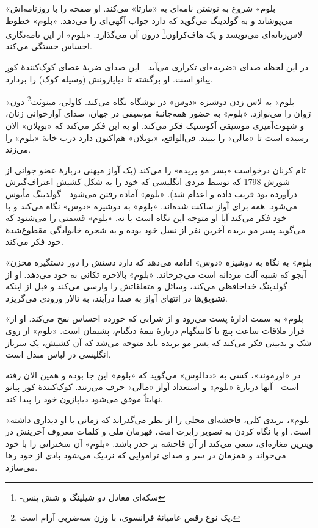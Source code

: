 \documentclass[12pt]{book}
\newcommand{\noun}[1]{«{#1}»}
\begin{document}
    \noun{بلوم} شروع به نوشتن نامه‌ای به \noun{مارتا} می‌کند. او صفحه را با روزنامه‌اش می‌پوشاند و به گولدینگ می‌گوید که دارد جواب آگهی‌ای را می‌دهد. \noun{بلوم} خطوط لاس‌زنانه‌ای می‌نویسد و یک هاف‌کراون\footnote{-سکه‌ای معادل دو شیلینگ و شش پنس} درون آن می‌گذارد. \noun{بلوم} از این نامه‌نگاری احساس خستگی می‌کند.

    در این لحظه صدای «ضربه»‌ای تکراری می‌آید - این صدای ضربۀ عصای کوک‌کنندۀ کورِ پیانو است. او برگشته تا دیاپازونش (وسیله کوک) را بردارد.

    \noun{بلوم} به لاس زدن دوشیزه \noun{دوس} در نوشگاه نگاه می‌کند. کاولی، مینوئت\footnote{یک نوع رقص عامیانۀ فرانسوی، با وزن سه‌ضربی آرام است.} دون ژوان را می‌نوازد. \noun{بلوم} به حضور همه‌جانبۀ موسیقی در جهان، صدای آوازخوانی زنان، و شهوت‌آمیزی موسیقی آکوستیک فکر می‌کند. او به این فکر می‌کند که \noun{بویلان} الان رسیده است تا \noun{مالی} را ببیند. فی‌الواقع، \noun{بویلان} هم‌اکنون دارد درب خانۀ \noun{بلوم} را می‌زند.

    تام کرنان درخواست «پسر مو بریده» را می‌کند (یک آواز میهنی دربارۀ عضو جوانی از شورش 1798 که توسط مردی انگلیسی که خود را به شکل کشیش اعتراف‌گیرش درآورده بود فریب داده و اعدام شد). \noun{بلوم} آماده رفتن می‌شود - گولدینگ مأیوس می‌شود. همه برای آواز ساکت شده‌اند. \noun{بلوم} به دوشیزه \noun{دوس} نگاه می‌کند و با خود فکر می‌کند آیا او متوجه این نگاه است یا نه. \noun{بلوم} قسمتی را می‌شنود که می‌گوید پسر مو بریده آخرین نفر از نسل خود بوده و به شجره خانوادگی مقطوع‌شدۀ خود فکر می‌کند.

    \noun{بلوم} به نگاه به دوشیزه \noun{دوس} ادامه می‌دهد که دارد دستش را دور دستگیره مخزن آبجو که شبیه آلت مردانه است می‌چرخاند. \noun{بلوم} بالاخره تکانی به خود می‌دهد. او از گولدینگ خداحافظی می‌کند، وسائل و متعلقاتش را وارسی می‌کند و قبل از اینکه تشویق‌ها در انتهای آواز به صدا درآیند، به تالار ورودی می‌گریزد.

    \noun{بلوم} به سمت ادارۀ پست می‌رود و از شرابی که خورده احساس نفخ می‌کند. او از قرار ملاقات ساعت پنج با کانینگهام دربارۀ بیمۀ دیگنام، پشیمان است. \noun{بلوم} از روی شک و بدبینی فکر می‌کند که پسر مو بریده باید متوجه می‌شد که آن کشیش، یک سرباز انگلیسی در لباس مبدل است.

    در \noun{اورموند}، کسی به \noun{ددالوس} می‌گوید که \noun{بلوم} این جا بوده و همین الان رفته است - آنها دربارۀ \noun{بلوم} و استعداد آواز \noun{مالی} حرف می‌زنند. کوک‌کنندۀ کور پیانو نهایتاً موفق می‌شود دیاپازون خود را پیدا کند.

    \noun{بلوم}، بریدی کلی، فاحشه‌ای محلی را از نظر می‌گذراند که زمانی با او دیداری داشته است. او با نگاه کردن به تصویر رابرت امت، قهرمان ملی و کلمات معروف آخرینش در ویترین مغازه‌ای، سعی می‌کند از آن فاحشه بر حذر باشد. \noun{بلوم} آن سخنرانی را با خود می‌خواند و همزمان در سر و صدای تراموایی که نزدیک می‌شود بادی از خود رها می‌سازد.
\end{document}

